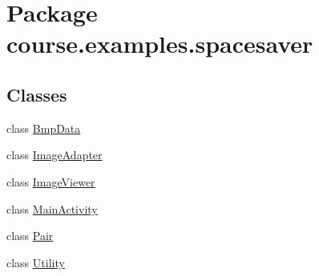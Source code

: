 \hypertarget{namespacecourse_1_1examples_1_1spacesaver}{}\section{Package course.\+examples.\+spacesaver}
\label{namespacecourse_1_1examples_1_1spacesaver}
\subsection*{Classes}
\begin{DoxyCompactItemize}
\item 
class \hyperlink{classcourse_1_1examples_1_1spacesaver_1_1_bmp_data}{Bmp\+Data}
\item 
class \hyperlink{classcourse_1_1examples_1_1spacesaver_1_1_image_adapter}{Image\+Adapter}
\item 
class \hyperlink{classcourse_1_1examples_1_1spacesaver_1_1_image_viewer}{Image\+Viewer}
\item 
class \hyperlink{classcourse_1_1examples_1_1spacesaver_1_1_main_activity}{Main\+Activity}
\item 
class \hyperlink{classcourse_1_1examples_1_1spacesaver_1_1_pair}{Pair}
\item 
class \hyperlink{classcourse_1_1examples_1_1spacesaver_1_1_utility}{Utility}
\end{DoxyCompactItemize}
